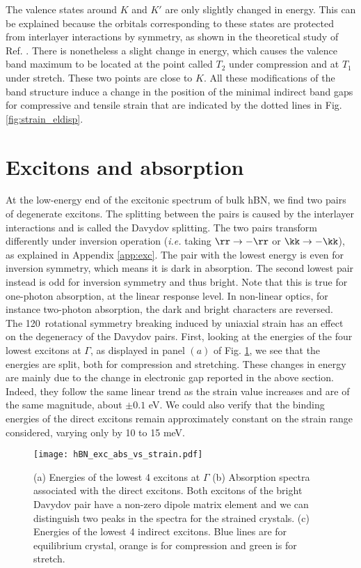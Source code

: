 The valence states around $K$ and $K'$ are only slightly changed in energy. This can be explained because the orbitals corresponding to these states are protected from interlayer interactions by symmetry, as shown in the theoretical study of Ref. \cite{kang2016unified}. There is nonetheless a slight change in energy, which causes the valence band maximum to be located at the point called $T_2$ under compression and at $T_1$ under stretch. These two points are close to $K$.
All these modifications of the band structure induce a change in the position of the minimal indirect band gaps for compressive and tensile strain that are indicated by the dotted lines in Fig. \ref{fig:strain_eldisp}.


%
\section{Excitons and absorption}
At the low-energy end of the excitonic spectrum of bulk \acrshort{hBN}, we find two pairs of degenerate excitons. The splitting between the pairs is caused by the interlayer interactions and is called the Davydov splitting.\cite{paleari2018excitons} The two pairs transform differently under inversion operation (\textit{i.e.} taking $\rr \to -\rr$ or $\kk \to -\kk$), as explained in Appendix \ref{app:exc}. The pair with the lowest energy is even for inversion symmetry, which means it is dark in absorption. The second lowest pair instead is odd for inversion symmetry and thus bright.
Note that this is true for one-photon absorption, at the linear response level. In non-linear optics, for instance two-photon absorption, the dark and bright characters are reversed.\cite{attaccalite2018two} \\
The 120\textdegree~rotational symmetry breaking induced by uniaxial strain has an effect on the degeneracy of the Davydov pairs. First, looking at the energies of the four lowest excitons at $\Gamma$, as displayed in panel $(a)$ of Fig. \ref{fig:exc_abs_vs_strain}, we see that the energies are split, both for compression and stretching. 
These changes in energy are mainly due to the change in electronic gap reported in the above section. Indeed, they follow the same linear trend as the strain value increases and are of the same magnitude, about $\pm 0.1$ eV. We could also verify that the binding energies of the direct excitons remain approximately constant on the strain range considered, varying only by 10 to 15 meV.
\begin{figure}[h!tb]
	\vspace{0.2cm}
	\setcapindent{2em}
	\centering
	\texttt{[image: hBN\_exc\_abs\_vs\_strain.pdf]}
	\caption{(a) Energies of the lowest 4 excitons at $\Gamma$ (b) Absorption spectra associated with the direct excitons. Both excitons of the bright Davydov pair have a non-zero dipole matrix element and we can distinguish two peaks in the spectra for the strained crystals. (c) Energies of the lowest 4 indirect excitons. Blue lines are for equilibrium crystal, orange is for compression and green is for stretch. }
	\label{fig:exc_abs_vs_strain}
\end{figure}

